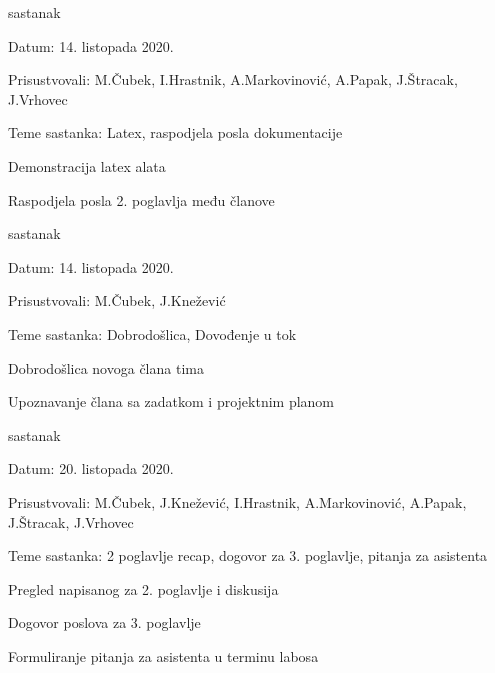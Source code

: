\begin{packed_enum}
			\item  sastanak
			\item[] \begin{packed_item}
				\item Datum: 14. listopada 2020.
				\item Prisustvovali: M.Čubek, I.Hrastnik, A.Markovinović, A.Papak, J.Štracak, J.Vrhovec
				\item Teme sastanka: Latex, raspodjela posla dokumentacije
				\begin{packed_item}
					\item  Demonstracija latex alata
					\item  Raspodjela posla 2. poglavlja među članove
				\end{packed_item}
			\end{packed_item}
		
			\item  sastanak
			\item[] \begin{packed_item}
				\item Datum: 14. listopada 2020.
				\item Prisustvovali: M.Čubek, J.Knežević
				\item Teme sastanka: Dobrodošlica, Dovođenje u tok
				\begin{packed_item}
					\item  Dobrodošlica novoga člana tima
					\item  Upoznavanje člana sa zadatkom i projektnim planom
				\end{packed_item}
			\end{packed_item}
		
			\item  sastanak
			\item[] \begin{packed_item}
				\item Datum: 20. listopada 2020.
				\item Prisustvovali: M.Čubek, J.Knežević, I.Hrastnik, A.Markovinović, A.Papak, J.Štracak, J.Vrhovec
				\item Teme sastanka: 2 poglavlje recap, dogovor za 3. poglavlje, pitanja za asistenta
				\begin{packed_item}
					\item  Pregled napisanog za 2. poglavlje i diskusija
					\item  Dogovor poslova za 3. poglavlje
					\item  Formuliranje pitanja za asistenta u terminu labosa
				\end{packed_item}
			\end{packed_item}
		

\end{packed_enum}
